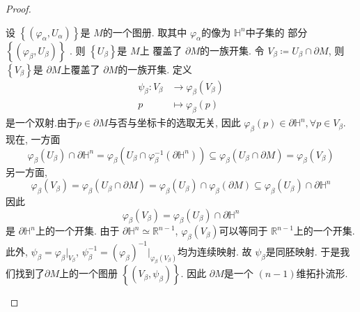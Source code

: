 \documentclass[../main.tex]{subfiles}
\begin{document}
\begin{proof}
\begin{enumerate}
    设 \(  \left\{ \left(  \varphi _{\alpha }, U_{\alpha } \right)  \right\}  \)是 \(  M  \)的一个图册. 取其中 \(   \varphi _{\alpha }  \)的像为 \(  \mathbb{H}^{n}  \)中子集的 部分 \(  \left\{  \left( \varphi _{\beta }, U_{\beta } \right)  \right\}  \)    . 则 \(  \left\{ U_{\beta } \right\}  \)是 \(  M  \)上  覆盖了 \(   \partial M  \)的一族开集.   令 \(  V_{\beta }\coloneqq U_{\beta }\cap  \partial M  \), 则 \(  \left\{ V_{\beta } \right\}  \)是 \(   \partial M  \)上覆盖了 \(   \partial M  \)的一族开集.    定义 \[
   \begin{aligned}
    \psi _{\beta }: V_{\beta }&\to  \varphi _{\beta }\left( V_{\beta } \right) \\ 
      p&\mapsto  \varphi _{\beta }\left( p \right) 
   \end{aligned}
    \] 是一个双射.由于\(  p \in  \partial M  \)与否与坐标卡的选取无关, 因此 \(   \varphi _{\beta }\left( p \right)\in  \partial \mathbb{H}^{n}, \forall p \in V_{\beta }   \). 现在, 一方面 \[
     \varphi _{\beta }\left( U_{\beta } \right)\cap  \partial \mathbb{H}^{n}=  \varphi _{\beta }\left( U_{\beta }\cap   \varphi _{\beta }^{-1} \left(  \partial \mathbb{H}^{n} \right)  \right)\subseteq  \varphi _{\beta }\left( U_{\beta }\cap  \partial M \right)=  \varphi _{\beta }\left( V_{\beta } \right)    
    \]另一方面, \[
     \varphi _{\beta }\left( V_{\beta } \right)=  \varphi _{\beta }\left( U_{\beta }\cap  \partial M \right)=  \varphi _{\beta }\left( U_{\beta } \right)\cap  \varphi _{\beta }\left(  \partial M \right)\subseteq  \varphi _{\beta }\left( U_{\beta } \right)\cap  \partial \mathbb{H}^{n}     
    \]因此 \[
     \varphi _{\beta }\left( V_{\beta } \right)=   \varphi _{\beta }\left( U_{\beta } \right)\cap  \partial \mathbb{H}^{n}  
    \]是 \(   \partial \mathbb{H}^{n} \)上的一个开集.  由于 \(   \partial \mathbb{H}^{n}\simeq \mathbb{R} ^{n-1}  \), \(   \varphi _{\beta }\left( V_{\beta } \right)   \)可以等同于 \(  \mathbb{R} ^{n-1}  \)上的一个开集.  此外,  \(  \psi _{\beta }=  \varphi _{\beta }|_{V_{\beta }}  \),  \(  \psi _{\beta }^{-1} = \left(  \varphi _{\beta } \right)^{-1} |_{ \varphi _{\beta }\left( V_{\beta } \right) }   \)均为连续映射.    故 \(  \psi _{\beta }  \)是同胚映射. 于是我们找到了\(   \partial M  \)上的一个图册 \(  \left\{ \left( V_{\beta }, \psi _{\beta } \right)  \right\}  \). 因此 \(   \partial M  \)是一个 \(  \left( n-1 \right)   \)维拓扑流形.    
   \end{enumerate}
    
\end{proof}
\end{document}
